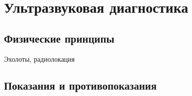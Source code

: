\section{Ультразвуковая диагностика}
\subsection{Физические принципы}
Эхолоты, радиолокация
\subsection{Показания и противопоказания}